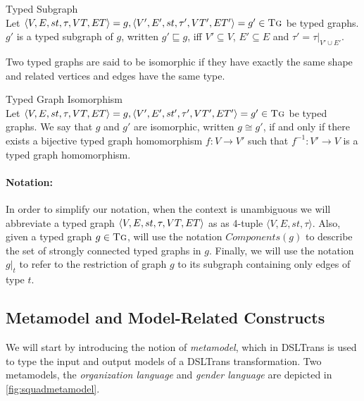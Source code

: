 \begin{definition}{Typed Subgraph\\}
\label{def:typedsubgraph}
Let $\langle V,E,st,\tau,VT,ET\rangle=g,\langle V',E',st,\tau',VT',ET'\rangle=g'\in \textsc{Tg}$ be typed graphs. $g'$ is a typed subgraph of $g$, written $g'\sqsubseteq g$, iff $V'\subseteq V$, $E'\subseteq E$ and $\tau'=\tau |_{V'\cup E'}$.

\end{definition} 


Two typed graphs are said to be isomorphic if they have exactly the same shape and related vertices and edges have the same type.


\begin{definition}{Typed Graph Isomorphism\\}
\label{def:typed_graph_isomorphism}
Let $\langle V,E,st,\tau,VT,ET\rangle=g,\langle V',E',st',\tau',VT',ET'\rangle=g'\in \textsc{Tg}$ be typed graphs. We say that $g$ and $g'$ are isomorphic, written $g\cong g'$, if and only if there exists a bijective typed graph homomorphism $f:V\rightarrow V'$ such that $f^{-1}:V'\rightarrow V$ is a typed graph homomorphism.
\end{definition}

\paragraph{\textbf{Notation:}}
In order to simplify our notation, when the context is unambiguous we will abbreviate a typed graph $\langle V,E,st,\\\tau,VT, ET\rangle$ as as 4-tuple $\langle V,E,st,\tau\rangle$. Also, given a typed graph $g\in \textsc{Tg}$, will use the notation $Components(g)$ to describe the set of strongly connected typed graphs in $g$. Finally, we will use the notation $g|_{t}$ to refer to the restriction of graph $g$ to its subgraph containing only edges of type $t$.

\subsection{Metamodel and Model-Related Constructs}
\label{sec:DSLTrans_formal}

We will start by introducing the notion of \emph{metamodel}, which in DSLTrans is used to type the input and output models of a DSLTrans transformation.  Two metamodels, the \emph{organization language} and \emph{gender language} are depicted in \cref{fig:squadmetamodel}.

